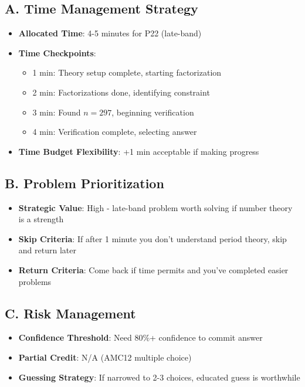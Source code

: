 \documentclass[11pt]{article}
\begin{document}
\begin{competitionbox}
\subsection*{A. Time Management Strategy}
\begin{itemize}[leftmargin=*]
    \item \textbf{Allocated Time}: 4-5 minutes for P22 (late-band)
    \item \textbf{Time Checkpoints}:
    \begin{itemize}
        \item 1 min: Theory setup complete, starting factorization
        \item 2 min: Factorizations done, identifying constraint
        \item 3 min: Found $n = 297$, beginning verification
        \item 4 min: Verification complete, selecting answer
    \end{itemize}
    \item \textbf{Time Budget Flexibility}: +1 min acceptable if making progress
\end{itemize}

\subsection*{B. Problem Prioritization}
\begin{itemize}[leftmargin=*]
    \item \textbf{Strategic Value}: High - late-band problem worth solving if number theory is a strength
    \item \textbf{Skip Criteria}: If after 1 minute you don't understand period theory, skip and return later
    \item \textbf{Return Criteria}: Come back if time permits and you've completed easier problems
\end{itemize}

\subsection*{C. Risk Management}
\begin{itemize}[leftmargin=*]
    \item \textbf{Confidence Threshold}: Need 80\%+ confidence to commit answer
    \item \textbf{Partial Credit}: N/A (AMC12 multiple choice)
    \item \textbf{Guessing Strategy}: If narrowed to 2-3 choices, educated guess is worthwhile
\end{itemize}


\end{competitionbox}
\end{document}
